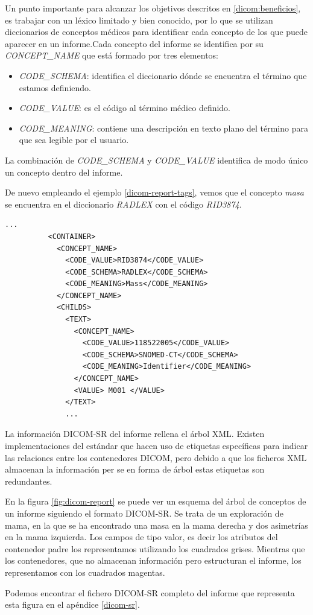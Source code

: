 Un punto importante para alcanzar los objetivos descritos en \ref{dicom:beneficios}, es trabajar con un léxico limitado y bien conocido, por lo que se utilizan diccionarios de conceptos médicos para identificar cada concepto de los que puede aparecer en un informe.Cada concepto del informe se identifica por su \textit{CONCEPT\_NAME} que está formado por tres elementos:
\begin{itemize}
	\item \textit{CODE\_SCHEMA}: identifica el diccionario dónde se encuentra el término que estamos definiendo.
	\item \textit{CODE\_VALUE}: es el código al término médico definido.
	\item \textit{CODE\_MEANING}: contiene una descripción en texto plano del término para que sea legible por el usuario.
\end{itemize}
La combinación de \textit{CODE\_SCHEMA} y \textit{CODE\_VALUE} identifica de modo único un concepto dentro del informe.\par
De nuevo empleando el ejemplo \ref{dicom-report-tags}, vemos que el concepto \textit{masa} se encuentra en el diccionario \textit{RADLEX} con el código \textit{RID3874}.\medskip\par

\lstset{escapechar=@,style=dicom}
\renewcommand*\lstlistingname{Código}
\begin{lstlisting}[label=dicom-report-tags,caption=Fragmento de un informe estructurado de una exploración de mama]
		  ...
          <CONTAINER>
            <CONCEPT_NAME>
              <CODE_VALUE>RID3874</CODE_VALUE>
              <CODE_SCHEMA>RADLEX</CODE_SCHEMA>
              <CODE_MEANING>Mass</CODE_MEANING>
            </CONCEPT_NAME>
            <CHILDS>
              <TEXT>
                <CONCEPT_NAME>
                  <CODE_VALUE>118522005</CODE_VALUE>
                  <CODE_SCHEMA>SNOMED-CT</CODE_SCHEMA>
                  <CODE_MEANING>Identifier</CODE_MEANING>
                </CONCEPT_NAME>
                <VALUE> M001 </VALUE>
              </TEXT>
              ...
\end{lstlisting}

La información DICOM-SR del informe rellena el árbol XML. Existen implementaciones del estándar que hacen uso de etiquetas específicas para indicar las relaciones entre los contenedores DICOM, pero debido a que los ficheros XML almacenan la información per se en forma de árbol estas etiquetas son redundantes.\par
En la figura \ref{fig:dicom-report} se puede ver un esquema del árbol de conceptos de un informe siguiendo el formato DICOM-SR. Se trata de un exploración de mama, en la que se ha encontrado una masa en la mama derecha y dos asimetrías en la mama izquierda. Los campos de tipo valor, es decir los atributos del contenedor padre los representamos utilizando los cuadrados grises. Mientras que los contenedores, que no almacenan información pero estructuran el informe, los representamos con los cuadrados magentas.\par
Podemos encontrar el fichero DICOM-SR completo del informe que representa esta figura en el apéndice \ref{dicom-sr}.	\par

